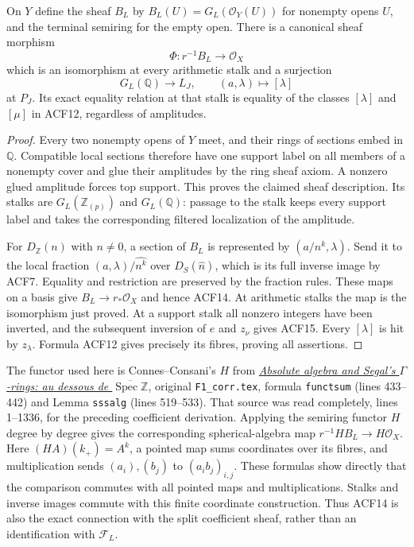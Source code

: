 \begin{proposition}
On $Y$ define the sheaf $B_L$ by
$B_L(U)=G_L(\mathcal O_Y(U))$ for nonempty opens $U$, and the terminal
semiring for the empty open. There is a canonical sheaf morphism
\begin{equation}\tag{ACF14}
 \Phi:r^{-1}B_L\longrightarrow\mathcal O_X
\end{equation}
which is an isomorphism at every arithmetic stalk and a surjection
\begin{equation}\tag{ACF15}
 G_L(\mathbb Q)\longrightarrow L_J,\qquad
 (a,\lambda)\longmapsto[\lambda]
\end{equation}
at $P_J$. Its exact equality relation at that stalk is equality of the
classes $[\lambda]$ and $[\mu]$ in ACF12, regardless of amplitudes.
\end{proposition}
\begin{proof}
Every two nonempty opens of $Y$ meet, and their rings of sections embed
in $\mathbb Q$. Compatible local sections therefore have one support
label on all members of a nonempty cover and glue their amplitudes by
the ring sheaf axiom. A nonzero glued amplitude forces top support.
This proves the claimed sheaf description. Its stalks are
$G_L(\mathbb Z_{(p)})$ and $G_L(\mathbb Q)$: passage to the stalk keeps
every support label and takes the corresponding filtered localization
of the amplitude.

For $D_{\mathbb Z}(n)$ with $n\ne0$, a section of $B_L$ is represented
by $(a/n^k,\lambda)$. Send it to the local fraction
$(a,\lambda)/\widehat{n^k}$ over $D_S(\widehat n)$, which is its full
inverse image by ACF7. Equality and restriction are preserved by the
fraction rules. These maps on a basis give $B_L\to r_*\mathcal O_X$
and hence ACF14. At arithmetic stalks the map is the isomorphism just
proved. At a support stalk all nonzero integers have been inverted,
and the subsequent inversion of $e$ and $z_\nu$ gives ACF15. Every
$[\lambda]$ is hit by $z_\lambda$. Formula ACF12 gives precisely its
fibres, proving all assertions.
\end{proof}
The functor used here is Connes--Consani's $H$ from
\href{https://arxiv.org/abs/1502.05585}{\emph{Absolute algebra and
Segal's $\Gamma$-rings: au dessous de $\overline{\operatorname{Spec}
\mathbb Z}$}}, original \texttt{F1\_corr.tex}, formula
\texttt{functsum} (lines 433--442) and Lemma \texttt{sssalg}
(lines 519--533). That source was read completely, lines 1--1336,
for the preceding coefficient derivation.
Applying the semiring functor $H$ degree by degree gives the corresponding
spherical-algebra map $r^{-1}HB_L\to H\mathcal O_X$. Here
$(HA)(k_+)=A^k$, a pointed map sums coordinates over its fibres, and
multiplication sends $(a_i),(b_j)$ to $(a_i b_j)_{i,j}$. These formulas
show directly that the comparison commutes with all pointed maps and
multiplications. Stalks and inverse images commute with this finite
coordinate construction. Thus ACF14 is also the exact connection with
the split coefficient sheaf, rather than an identification with
$\mathcal F_L$.


